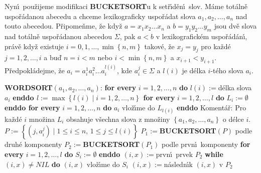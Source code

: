 \flushpar Nyn\'\i\ pou\v zijeme modifikaci {\bf BUCKETSORT}u k 
set\v r\'\i d\v en\'\i\ slov.  M\'ame tot\'aln\v e 
uspo\v r\'ada\-nou abecedu a chceme lexikograficky uspo\v r\'adat slova 
$a_1,a_2,\dots,a_n$ nad touto abecedou. P\v ri\-po\-me\v n\-me, \v ze kdy\v z $
a=x_1x_2\dots x_n$ a 
$b=y_1y_2\dots y_m$ jsou dv\v e slova nad tot\'aln\v e uspo\v r\'a\-danou 
abecedou $\Sigma$, pak $a<b$ v lexikografick\'em uspo\v r\'ad\'an\'\i , pr\'av\v e 
kdy\v z existuje $i=0,1,\dots,\min\left\{n,m\right\}$ takov\'e, \v ze $x_j=y_
j$ 
pro ka\v zd\'e $j=1,2,\dots,i$ a bu\v d $n=i<m$ nebo $i<\min\left\{n,m
\right\}$ 
a $x_{i+1}<y_{i+1}$. P\v redpokl\'adejme, \v ze $a_i=a_i^1a_i^2\dots 
a_i^{l\left(i\right)}$, kde 
$a_i^j\in\Sigma$ a $l\left(i\right)$ je d\'elka $i$-t\'eho slova $a_i$.
\bigskip

{\bf WORDSORT$\left(a_1,a_2,\dots,a_n\right)$}:\newline 
{\bf for every} $i=1,2,\dots,n$ {\bf do} $l\left(i\right):=$d\'elka slova $a_
i$ {\bf enddo\newline 
$l:=\max\left\{l\left(i\right)\mid i=1,2,\dots,n\right\}$\newline 
for every} $i=1,2,\dots,l$ {\bf do} $L_i:=\emptyset$ {\bf enddo\newline 
for every} $i=1,2,\dots,n$ {\bf do}\newline 
\phantom{---}$a_i$ vlo\v z\'\i me do $L_{l\left(i\right)}$\newline 
{\bf enddo}\newline 
Koment\'a\v r: Pro ka\v zd\'e $i$ mno\v zina $L_i$ obsahuje v\v sechna slova z mno\v ziny 
$\left\{a_1,a_2,\dots,a_n\right\}$ o d\'elce $i$.\newline 
$P:=\left\{\left(j,a_i^j\right)\mid 1\le i\le n,\,1\le j\le l\left(i\right)\right\}$\newline 
$P_1:=${\bf BUCKETSORT$\left(P\right)$} podle druh\'e komponenty\newline 
$P_2:=${\bf BUCKETSORT$\left(P_1\right)$} podle prvn\'\i\ komponenty\newline
{\bf for every} $i=1,2,\dots,l$ {\bf do} $S_i:=\emptyset$ {\bf enddo\newline 
$\left(i,x\right):=$}prvn\'\i\ prvek $P_2$\newline 
{\bf while} $\left(i,x\right)\ne NIL$ {\bf do}\newline 
\phantom{---}$\left(i,x\right)$ vlo\v z\'\i me do $S_i$\newline 
\phantom{---}$\left(i,x\right):=$n\'asledn\'\i k $\left(i,x\right)$ v $P_2$\newline 
